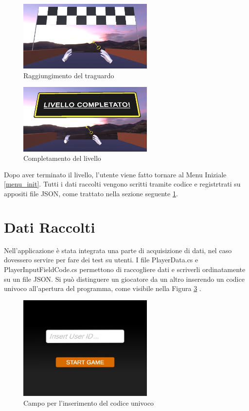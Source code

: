 \documentclass[target=bach,aauheader=]{thud}
\begin{document}
\begin{figure}[h]
    \centering
    \includegraphics[width=0.60\textwidth]{lvl5}
    \caption{Raggiungimento del traguardo}
    \label{fig:lvl5}
\end{figure}

\begin{figure}[h]
    \centering
    \includegraphics[width=0.60\textwidth]{lvl6}
    \caption{Completamento del livello}
    \label{fig:lvl6}
\end{figure}

Dopo aver terminato il livello, l'utente viene fatto tornare al Menu Iniziale \ref{menu_init}.
Tutti i dati raccolti vengono scritti tramite codice e registrtrati su appositi file JSON, come trattato nella sezione seguente \ref{data}.

\section{Dati Raccolti}
\label{data}
Nell'applicazione è stata integrata una parte di acquisizione di dati, nel caso dovessero servire per fare dei test su utenti.
I file PlayerData.cs e PlayerInputFieldCode.cs permettono di raccogliere dati e scriverli ordinatamente su un file JSON.
Si può distinguere un giocatore da un altro inserendo un codice univoco all'apertura del programma, come visibile nella Figura \ref{fig:cod} .

\begin{figure}[h]
    \centering
    \includegraphics[width=0.60\textwidth]{cod}
    \caption{Campo per l'inserimento del codice univoco}
    \label{fig:cod}
\end{figure}
\end{document}
